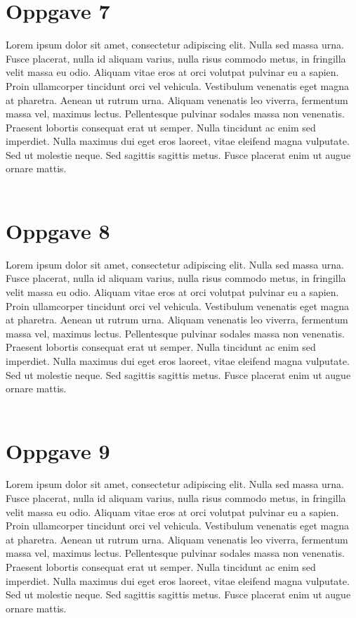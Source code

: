 \documentclass[norsk,a4paper,12pt]{article}
\begin{document}
\section*{Oppgave 7}

Lorem ipsum dolor sit amet, consectetur adipiscing elit. Nulla sed massa urna. Fusce placerat, nulla id aliquam varius, nulla risus commodo metus, in fringilla velit massa eu odio. Aliquam vitae eros at orci volutpat pulvinar eu a sapien. Proin ullamcorper tincidunt orci vel vehicula. Vestibulum venenatis eget magna at pharetra. Aenean ut rutrum urna. Aliquam venenatis leo viverra, fermentum massa vel, maximus lectus. Pellentesque pulvinar sodales massa non venenatis. Praesent lobortis consequat erat ut semper. Nulla tincidunt ac enim sed imperdiet. Nulla maximus dui eget eros laoreet, vitae eleifend magna vulputate. Sed ut molestie neque. Sed sagittis sagittis metus. Fusce placerat enim ut augue ornare mattis.
\\
\\

\section*{Oppgave 8}

Lorem ipsum dolor sit amet, consectetur adipiscing elit. Nulla sed massa urna. Fusce placerat, nulla id aliquam varius, nulla risus commodo metus, in fringilla velit massa eu odio. Aliquam vitae eros at orci volutpat pulvinar eu a sapien. Proin ullamcorper tincidunt orci vel vehicula. Vestibulum venenatis eget magna at pharetra. Aenean ut rutrum urna. Aliquam venenatis leo viverra, fermentum massa vel, maximus lectus. Pellentesque pulvinar sodales massa non venenatis. Praesent lobortis consequat erat ut semper. Nulla tincidunt ac enim sed imperdiet. Nulla maximus dui eget eros laoreet, vitae eleifend magna vulputate. Sed ut molestie neque. Sed sagittis sagittis metus. Fusce placerat enim ut augue ornare mattis.
\\
\\

\section*{Oppgave 9}

Lorem ipsum dolor sit amet, consectetur adipiscing elit. Nulla sed massa urna. Fusce placerat, nulla id aliquam varius, nulla risus commodo metus, in fringilla velit massa eu odio. Aliquam vitae eros at orci volutpat pulvinar eu a sapien. Proin ullamcorper tincidunt orci vel vehicula. Vestibulum venenatis eget magna at pharetra. Aenean ut rutrum urna. Aliquam venenatis leo viverra, fermentum massa vel, maximus lectus. Pellentesque pulvinar sodales massa non venenatis. Praesent lobortis consequat erat ut semper. Nulla tincidunt ac enim sed imperdiet. Nulla maximus dui eget eros laoreet, vitae eleifend magna vulputate. Sed ut molestie neque. Sed sagittis sagittis metus. Fusce placerat enim ut augue ornare mattis.
\\
\\
\end{document}
